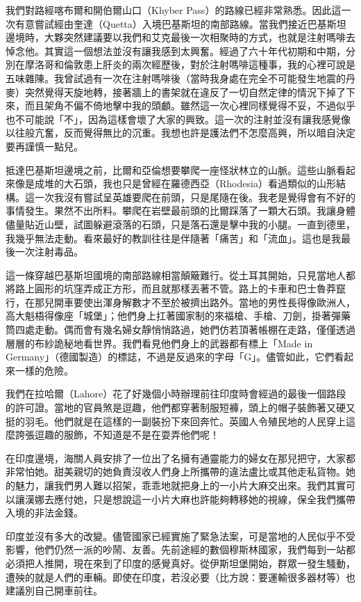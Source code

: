 我們對路經喀布爾和開伯爾山口（Khyber
Pass）的路線已經非常熟悉。因此這一次有意嘗試經由奎達（Quetta）入境巴基斯坦的南部路線。當我們接近巴基斯坦邊境時，大夥突然建議要以我們和艾克最後一次相聚時的方式，也就是注射嗎啡去悼念他。其實這一個想法並沒有讓我感到太興奮。經過了六十年代初期和中期，分別在摩洛哥和倫敦患上肝炎的兩次經歷後，對於注射嗎啡這種事，我的心裡可說是五味雜陳。我曾試過有一次在注射嗎啡後（當時我身處在完全不可能發生地震的丹麥）突然覺得天旋地轉，接著牆上的書架就在違反了一切自然定律的情況下掉了下來，而且架角不偏不倚地擊中我的頭顱。雖然這一次心裡同樣覺得不妥，不過似乎也不可能說「不」，因為這樣會壞了大家的興致。這一次的注射並沒有讓我感覺像以往般亢奮，反而覺得無比的沉重。我想也許是護法們不怎麼高興，所以暗自決定要再謹慎一點兒。

抵達巴基斯坦邊境之前，比爾和亞倫想要攀爬一座怪狀林立的山脈。這些山脈看起來像是成堆的大石頭，我也只是曾經在羅德西亞（Rhodesia）看過類似的山形結構。這一次我沒有嘗試呈英雄要爬在前頭，只是尾隨在後。我老是覺得會有不好的事情發生。果然不出所料。攀爬在岩壁最前頭的比爾踩落了一顆大石頭。我讓身體儘量貼近山壁，試圖躲避滾落的石頭，只是落石還是擊中我的小腿。一直到德里，我幾乎無法走動。看來最好的教訓往往是伴隨著「痛苦」和「流血」。這也是我最後一次注射毒品。

這一條穿越巴基斯坦國境的南部路線相當顛簸難行。從土耳其開始，只見當地人都將路上圓形的坑窪弄成正方形，而且就那樣丟著不管。路上的卡車和巴士魯莽竄行，在那兒開車要使出渾身解數才不至於被擠出路外。當地的男性長得像歐洲人，高大魁梧得像座「城堡」；他們身上扛著國家制的來福槍、手槍、刀劍，掛著彈藥筒四處走動。偶而會有幾名婦女靜悄悄路過，她們仿若頂著帳棚在走路，僅僅透過層層的布紗詭秘地看世界。我們看見他們身上的武器都有標上「Made
in
Germany」（德國製造）的標誌，不過是反過來的字母「G」。儘管如此，它們看起來一樣的危險。

我們在拉哈爾（Lahore）花了好幾個小時辦理前往印度時會經過的最後一個路段的許可證。當地的官員煞是逗趣，他們都穿著制服短褲，頭上的帽子裝飾著又硬又挺的羽毛。他們就是在這樣的一副裝扮下來回奔忙。英國人令殖民地的人民穿上這麼誇張逗趣的服飾，不知道是不是在耍弄他們呢！

在印度邊境，海關人員安排了一位出了名擁有通靈能力的婦女在那兒把守，大家都非常怕她。甜美親切的她負責沒收人們身上所攜帶的違法盧比或其他走私貨物。她的魅力，讓我們男人難以招架，乖乖地就把身上的一小片大麻交出來。我們其實可以讓漢娜去應付她，只是想說這一小片大麻也許能夠轉移她的視線，保全我們攜帶入境的非法金錢。

印度並沒有多大的改變。儘管國家已經實施了緊急法案，可是當地的人民似乎不受影響，他們仍然一派的吵鬧、友善。先前途經的數個穆斯林國家，我們每到一站都必須把人推開，現在來到了印度的感覺真好。從伊斯坦堡開始，群眾一發生騷動，遭殃的就是人們的車輛。即使在印度，若沒必要（比方說：要運輸很多器材等）也建議別自己開車前往。

